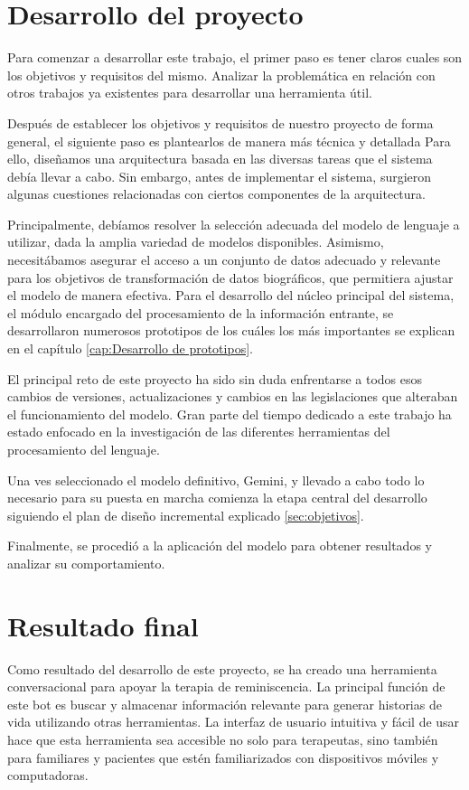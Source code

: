 \section{Desarrollo del proyecto}
Para comenzar a desarrollar este trabajo, el primer paso es tener claros cuales son los objetivos y requisitos del mismo. Analizar la problemática en relación con otros trabajos ya existentes para desarrollar una herramienta útil. 

Después de establecer los objetivos y requisitos de nuestro proyecto de forma general, el siguiente paso es plantearlos de manera más técnica y detallada Para ello, diseñamos una arquitectura basada en las diversas tareas que el sistema debía llevar a cabo. Sin embargo, antes de implementar el sistema, surgieron algunas cuestiones relacionadas con ciertos componentes de la arquitectura.

Principalmente, debíamos resolver la selección adecuada del modelo de lenguaje a utilizar, dada la amplia variedad de modelos disponibles. Asimismo, necesitábamos asegurar el acceso a un conjunto de datos adecuado y relevante para los objetivos de transformación de datos biográficos, que permitiera ajustar el modelo de manera efectiva.
Para el desarrollo del núcleo principal del sistema, el módulo encargado del procesamiento de la información entrante, se desarrollaron numerosos prototipos de los cuáles los más importantes se explican en el capítulo \ref{cap:Desarrollo de prototipos}. 

El principal reto de este proyecto ha sido sin duda enfrentarse a todos esos cambios de versiones, actualizaciones y cambios en las legislaciones que alteraban el funcionamiento del modelo. Gran parte del tiempo dedicado a este trabajo ha estado enfocado en la investigación de las diferentes herramientas del procesamiento del lenguaje.

Una ves seleccionado el modelo definitivo, Gemini, y llevado a cabo todo lo necesario para su puesta en marcha comienza la etapa central del desarrollo siguiendo el plan de diseño incremental explicado \ref{sec:objetivos}. 

Finalmente, se procedió a la aplicación del modelo para obtener resultados y analizar su comportamiento. 


\section{Resultado final}
Como resultado del desarrollo de este proyecto, se ha creado una herramienta conversacional para apoyar la terapia de reminiscencia. La principal función de este bot es buscar y almacenar información relevante para generar historias de vida utilizando otras herramientas. La interfaz de usuario intuitiva y fácil de usar hace que esta herramienta sea accesible no solo para terapeutas, sino también para familiares y pacientes que estén familiarizados con dispositivos móviles y computadoras.

